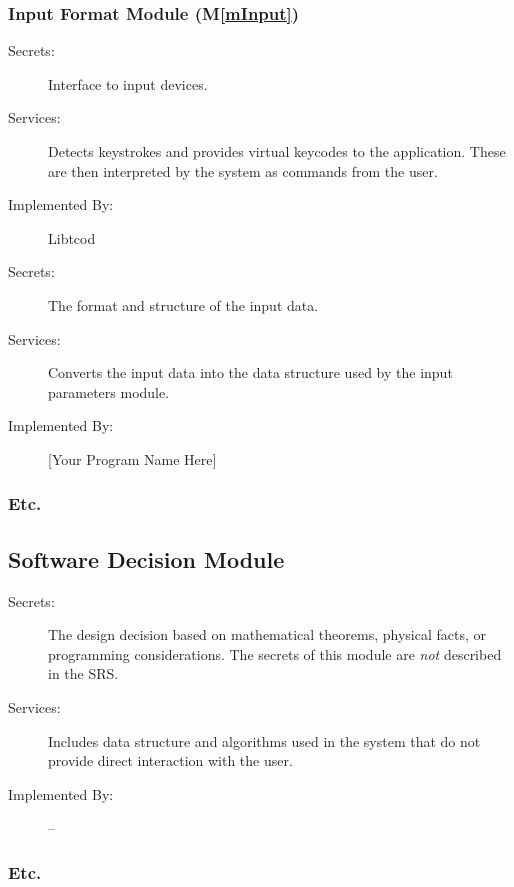 \documentclass[12pt, titlepage]{article}
\newcommand{\mref}[1]{M\ref{#1}}
\begin{document}
\subsubsection{Input Format Module (\mref{mInput})}

\begin{description}
\item[Secrets:]Interface to input devices.
\item[Services:]Detects keystrokes and provides virtual keycodes to the application.
These are then interpreted by the system as commands from the user.
\item[Implemented By:] Libtcod
\end{description}

\begin{description}
\item[Secrets:]The format and structure of the input data.
\item[Services:]Converts the input data into the data structure used by the
  input parameters module.
\item[Implemented By:] [Your Program Name Here]
\end{description}

\subsubsection{Etc.}


\subsection{Software Decision Module}

\begin{description}
\item[Secrets:] The design decision based on mathematical theorems, physical
  facts, or programming considerations. The secrets of this module are
  \emph{not} described in the SRS.
\item[Services:] Includes data structure and algorithms used in the system that
  do not provide direct interaction with the user. 
\item[Implemented By:] --
\end{description}

\subsubsection{Etc.}
\end{document}
